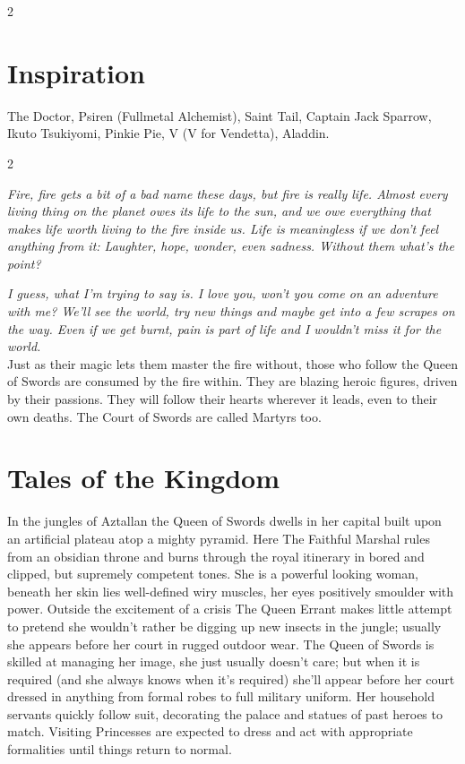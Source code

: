 \begin{multicols}{2}
\section*{Inspiration}
The Doctor, Psiren (Fullmetal Alchemist), Saint Tail, Captain Jack Sparrow, Ikuto Tsukiyomi, Pinkie Pie, V (V for Vendetta), Aladdin. 

\end{multicols}
\label{scha:Swords}\begin{multicols}{2}\raggedcolumns

\noindent \textit{Fire, fire gets a bit of a bad name these days, but fire is really life. Almost every living thing on the planet owes its life to the sun, and we owe everything that makes life worth living to the fire inside us. Life is meaningless if we don't feel anything from it: Laughter, hope, wonder, even sadness. Without them what's the point?}

\textit{I guess, what I'm trying to say is. I love you, won't you come on an adventure with me? We'll see the world, try new things and maybe get into a few scrapes on the way. Even if we get burnt, pain is part of life and I wouldn't miss it for the world.}\\

\noindent Just as their magic lets them master the fire without, those who follow the Queen of Swords are consumed by the fire within. They are blazing heroic figures, driven by their passions. They will follow their hearts wherever it leads, even to their own deaths. The Court of Swords are called Martyrs too. 

\section*{Tales of the Kingdom}

In the jungles of Aztallan the Queen of Swords dwells in her capital built upon an artificial plateau atop a mighty pyramid. Here The Faithful Marshal rules from an obsidian throne and burns through the royal itinerary in bored and clipped, but supremely competent tones. She is a powerful looking woman, beneath her skin lies well-defined wiry muscles, her eyes positively smoulder with power. Outside the excitement of a crisis The Queen Errant makes little attempt to pretend she wouldn't rather be digging up new insects in the jungle; usually she appears before her court in rugged outdoor wear. The Queen of Swords is skilled at managing her image, she just usually doesn't care; but when it is required (and she always knows when it's required) she'll appear before her court dressed in anything from formal robes to full military uniform. Her household servants quickly follow suit, decorating the palace and statues of past heroes to match. Visiting Princesses are expected to dress and act with appropriate 
formalities until things return to normal.


\end{multicols}
